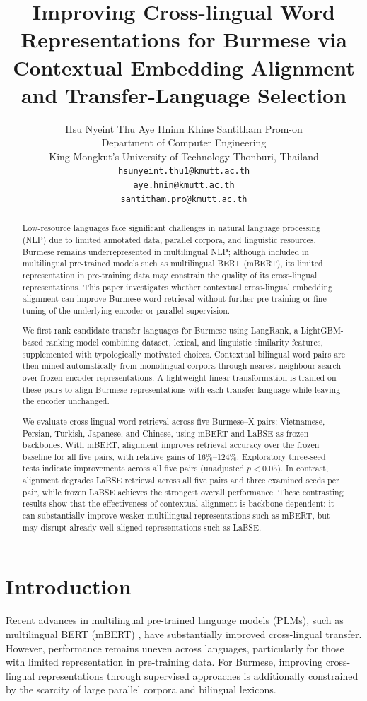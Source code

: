 \documentclass[11pt]{article}
\title{Improving Cross-lingual Word Representations for Burmese via Contextual Embedding Alignment and Transfer-Language Selection}
\author{Hsu Nyeint Thu \quad Aye Hninn Khine \quad Santitham Prom-on\\
Department of Computer Engineering\\
King Mongkut's University of Technology Thonburi, Thailand\\
\texttt{hsunyeint.thu1@kmutt.ac.th}\\
\texttt{aye.hnin@kmutt.ac.th}\\
\texttt{santitham.pro@kmutt.ac.th}}
\begin{document}
\maketitle
\begin{abstract}
Low-resource languages face significant challenges in natural language processing (NLP) due to limited annotated data, parallel corpora, and linguistic resources. Burmese remains underrepresented in multilingual NLP; although included in multilingual pre-trained models such as multilingual BERT (mBERT), its limited representation in pre-training data may constrain the quality of its cross-lingual representations. This paper investigates whether contextual cross-lingual embedding alignment can improve Burmese word retrieval without further pre-training or fine-tuning of the underlying encoder or parallel supervision.

We first rank candidate transfer languages for Burmese using LangRank, a LightGBM-based ranking model combining dataset, lexical, and linguistic similarity features, supplemented with typologically motivated choices. Contextual bilingual word pairs are then mined automatically from monolingual corpora through nearest-neighbour search over frozen encoder representations. A lightweight linear transformation is trained on these pairs to align Burmese representations with each transfer language while leaving the encoder unchanged.

We evaluate cross-lingual word retrieval across five Burmese–X pairs: Vietnamese, Persian, Turkish, Japanese, and Chinese, using mBERT and LaBSE as frozen backbones. With mBERT, alignment improves retrieval accuracy over the frozen baseline for all five pairs, with relative gains of 16\%–124\%. Exploratory three-seed tests indicate improvements across all five pairs (unadjusted $p<0.05$). In contrast, alignment degrades LaBSE retrieval across all five pairs and three examined seeds per pair, while frozen LaBSE achieves the strongest overall performance. These contrasting results show that the effectiveness of contextual alignment is backbone-dependent: it can substantially improve weaker multilingual representations such as mBERT, but may disrupt already well-aligned representations such as LaBSE.
\end{abstract}

\section{Introduction}

Recent advances in multilingual pre-trained language models (PLMs), such as
multilingual BERT (mBERT) \citep{devlin-etal-2019-bert}, have substantially
improved cross-lingual transfer. However, performance remains uneven across
languages, particularly for those with limited representation in pre-training data. For Burmese, improving cross-lingual
representations through supervised approaches is additionally constrained by
the scarcity of large parallel corpora and bilingual lexicons.
\end{document}
